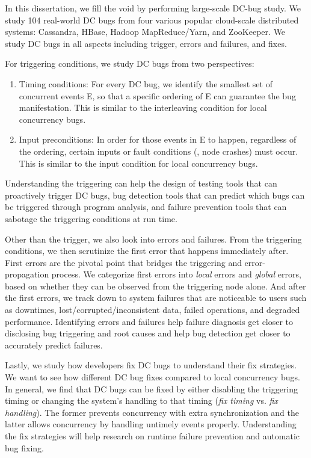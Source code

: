 In this dissertation, we fill the void by performing large-scale DC-bug study.
We study 104 real-world DC bugs from four various popular cloud-scale
distributed systems: Cassandra, HBase, Hadoop MapReduce/Yarn, and ZooKeeper. We
study DC bugs in all aspects including trigger, errors and failures, and fixes. 

For triggering conditions, we study DC bugs from two perspectives:
\begin{enumerate}

\item Timing conditions: For every DC bug, we identify the smallest set of
concurrent events E, so that a specific ordering of E can guarantee the bug
manifestation. This is similar to the interleaving condition for local
concurrency bugs.

\item Input preconditions: In order for those events in E to happen, regardless
of the ordering, certain inputs or fault conditions (\eg, node crashes) must
occur. This is similar to the input condition for local concurrency bugs.

\end{enumerate}
Understanding the triggering can help the design of testing tools that can
proactively trigger DC bugs, bug detection tools that can predict which bugs can
be triggered through program analysis, and failure prevention tools that can
sabotage the triggering conditions at run time.

Other than the trigger, we also look into errors and failures. From the
triggering conditions, we then scrutinize the first error that happens
immediately after. First errors are the pivotal point that bridges the
triggering and error-propagation process. We categorize first errors into {\em
local} errors and {\em global} errors, based on whether they can be observed
from the triggering node alone. 
%
And after the first errors, we track down to system failures that are noticeable
to users such as downtimes, lost/corrupted/inconsistent data, failed operations,
and degraded performance. Identifying errors and failures help failure diagnosis
get closer to disclosing bug triggering and root causes and help bug detection
get closer to accurately predict failures.

Lastly, we study how developers fix DC bugs to understand their fix strategies.
We want to see how different DC bug fixes compared to local concurrency bugs. In
general, we find that DC bugs can be fixed by either disabling the triggering
timing or changing the system's handling to that timing ({\em fix timing} vs.
{\em fix handling}). The former prevents concurrency with extra synchronization
and the latter allows concurrency by handling untimely events properly.
Understanding the fix strategies will help research on runtime failure
prevention and automatic bug fixing.

